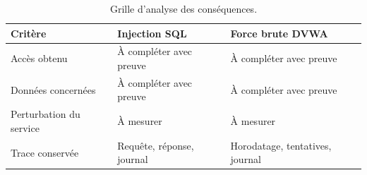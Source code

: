 \begin{table}[H]
    \centering
    \caption{Grille d'analyse des conséquences.}\label{tab:impacts}
    \begin{tabular}{@{}p{}p{}p{}@{}}
        \toprule
        Critère & Injection SQL & Force brute DVWA \\
        \midrule
        Accès obtenu & À compléter avec preuve & À compléter avec preuve \\
        Données concernées & À compléter avec preuve & À compléter avec preuve \\
        Perturbation du service & À mesurer & À mesurer \\
        Trace conservée & Requête, réponse, journal & Horodatage, tentatives, journal \\
        \bottomrule
    \end{tabular}
\end{table}
